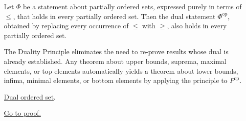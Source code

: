 
\begin{proposition}
\label{prop:duality-principle}
Let $\Phi$ be a statement about partially ordered sets, expressed purely
in terms of $\leq$, that holds in every partially ordered set.  Then the
dual statement $\Phi^{\mathrm{op}}$, obtained by replacing every
occurrence of $\leq$ with $\geq$, also holds in every partially ordered
set.
\end{proposition}

\begin{remark*}[Interpretation]
The Duality Principle eliminates the need to re-prove results whose dual
is already established.  Any theorem about upper bounds, suprema, maximal
elements, or top elements automatically yields a theorem about lower
bounds, infima, minimal elements, or bottom elements by applying the
principle to $P^{\mathrm{op}}$.
\end{remark*}

\begin{remark*}[Dependencies]
\hyperref[def:dual-ordered-set]{Dual ordered set}.
\end{remark*}

\begin{remark*}[Proof]
\hyperref[prf:duality-principle]{Go to proof.}
\end{remark*}
